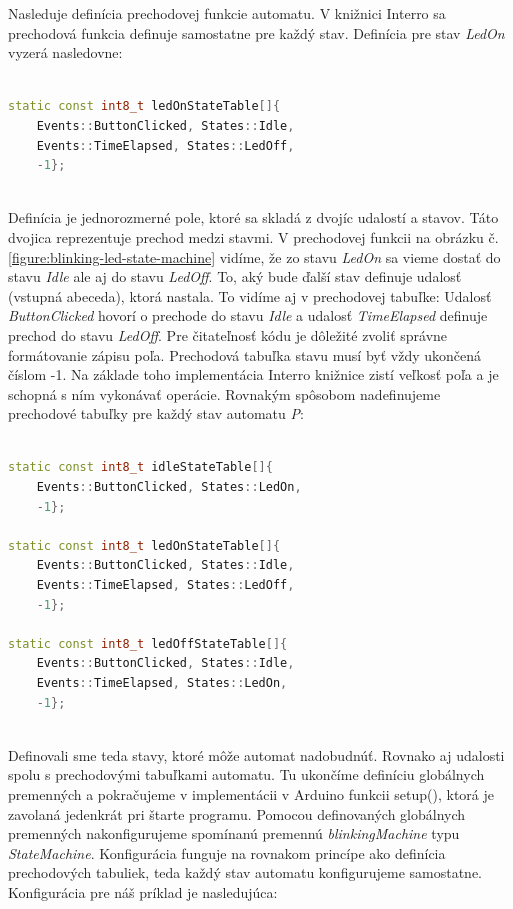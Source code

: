 Nasleduje definícia prechodovej funkcie automatu. V knižnici Interro sa prechodová funkcia definuje samostatne pre každý stav.
Definícia pre stav \textit{LedOn} vyzerá nasledovne:

\begin{lstlisting}[language=c++]  

static const int8_t ledOnStateTable[]{
    Events::ButtonClicked, States::Idle,
    Events::TimeElapsed, States::LedOff,
    -1};
    
\end{lstlisting}

Definícia je jednorozmerné pole, ktoré sa skladá z dvojíc udalostí a stavov. Táto dvojica reprezentuje prechod medzi stavmi. V prechodovej funkcii na obrázku č.\ref{figure:blinking-led-state-machine} vidíme,
že zo stavu \textit{LedOn} sa vieme dostať do stavu \textit{Idle} ale aj do stavu \textit{LedOff}.
To, aký bude ďalší stav definuje udalosť (vstupná abeceda), ktorá nastala. To vidíme aj v prechodovej tabuľke: Udalosť \textit{ButtonClicked} hovorí o prechode do stavu
\textit{Idle} a udalosť \textit{TimeElapsed} definuje prechod do stavu \textit{LedOff}. Pre čitateľnosť kódu je dôležité zvoliť správne formátovanie zápisu poľa.
Prechodová tabuľka stavu musí byť vždy ukončená číslom -1. Na základe toho implementácia Interro knižnice zistí veľkosť poľa a je schopná s ním vykonávať operácie.
Rovnakým spôsobom nadefinujeme prechodové tabuľky pre každý stav automatu \textit{P}:

\begin{lstlisting}[language=c++]  

static const int8_t idleStateTable[]{
    Events::ButtonClicked, States::LedOn,
    -1};

static const int8_t ledOnStateTable[]{
    Events::ButtonClicked, States::Idle,
    Events::TimeElapsed, States::LedOff,
    -1};

static const int8_t ledOffStateTable[]{
    Events::ButtonClicked, States::Idle,
    Events::TimeElapsed, States::LedOn,
    -1};
    
\end{lstlisting}

Definovali sme teda stavy, ktoré môže automat nadobudnúť. Rovnako aj udalosti spolu s prechodovými tabuľkami automatu.
Tu ukončíme definíciu globálnych premenných a pokračujeme v implementácii v Arduino funkcii setup(), ktorá je zavolaná jedenkrát pri štarte programu.
Pomocou definovaných globálnych premenných nakonfigurujeme spomínanú premennú \textit{blinkingMachine} typu \textit{StateMachine}. Konfigurácia funguje
na rovnakom princípe ako definícia prechodových tabuliek, teda každý stav automatu konfigurujeme samostatne. Konfigurácia pre náš príklad je nasledujúca:

